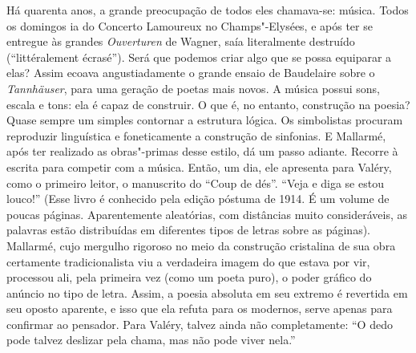Há quarenta anos, a grande preocupação de todos eles chamava-se: música.
Todos os domingos ia do Concerto Lamoureux no Champs"-Elysées, e após ter se entregue às grandes \emph{Ouverturen} de Wagner, saía literalmente destruído (``littéralement écrasé''). Será que podemos criar algo que se possa equiparar
a elas? Assim ecoava angustiadamente o grande ensaio de Baudelaire
sobre o \emph{Tannhäuser}, para uma geração de poetas mais novos. A música possui
sons, escala e tons: ela é capaz de construir. O que é, no entanto,
construção na poesia? Quase sempre um simples contornar a estrutura
lógica. Os simbolistas procuram reproduzir linguística e foneticamente a
construção de sinfonias. E Mallarmé, após ter realizado as obras"-primas
desse estilo, dá um passo adiante. Recorre à
escrita para competir com a música. Então, um dia, ele apresenta para
Valéry, como o primeiro leitor, o manuscrito do ``Coup de dés''. ``Veja
e diga se estou louco!'' (Esse livro é conhecido pela edição póstuma de
1914. É um volume de poucas páginas. Aparentemente aleatórias,
com distâncias muito consideráveis, as palavras estão distribuídas em
diferentes tipos de letras sobre as páginas). Mallarmé, cujo mergulho
rigoroso no meio da construção cristalina de sua obra certamente
tradicionalista viu a verdadeira imagem do que estava por vir, processou
ali, pela primeira vez (como um poeta puro), o poder gráfico do anúncio
no tipo de letra. Assim, a poesia absoluta em seu extremo é revertida em seu oposto
aparente, e isso que ela refuta para os modernos, serve apenas para confirmar ao pensador. Para Valéry, talvez ainda não completamente: ``O dedo
pode talvez deslizar pela chama, mas não pode viver nela.''
